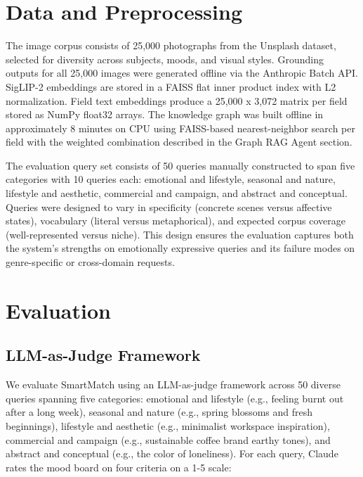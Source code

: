 \documentclass[
  11pt,
]{article}
\begin{document}
\section{Data and Preprocessing}\label{data-and-preprocessing}

The image corpus consists of 25,000 photographs from the Unsplash
dataset, selected for diversity across subjects, moods, and visual
styles. Grounding outputs for all 25,000 images were generated offline
via the Anthropic Batch API. SigLIP-2 embeddings are stored in a FAISS
flat inner product index with L2 normalization. Field text embeddings
produce a 25,000 x 3,072 matrix per field stored as NumPy float32
arrays. The knowledge graph was built offline in approximately 8 minutes
on CPU using FAISS-based nearest-neighbor search per field with the
weighted combination described in the Graph RAG Agent section.

The evaluation query set consists of 50 queries manually constructed to
span five categories with 10 queries each: emotional and lifestyle,
seasonal and nature, lifestyle and aesthetic, commercial and campaign,
and abstract and conceptual. Queries were designed to vary in
specificity (concrete scenes versus affective states), vocabulary
(literal versus metaphorical), and expected corpus coverage
(well-represented versus niche). This design ensures the evaluation
captures both the system's strengths on emotionally expressive queries
and its failure modes on genre-specific or cross-domain requests.

\section{Evaluation}\label{evaluation}

\subsection{LLM-as-Judge Framework}\label{llm-as-judge-framework}

We evaluate SmartMatch using an LLM-as-judge framework across 50 diverse
queries spanning five categories: emotional and lifestyle (e.g., feeling
burnt out after a long week), seasonal and nature (e.g., spring blossoms
and fresh beginnings), lifestyle and aesthetic (e.g., minimalist
workspace inspiration), commercial and campaign (e.g., sustainable
coffee brand earthy tones), and abstract and conceptual (e.g., the color
of loneliness). For each query, Claude rates the mood board on four
criteria on a 1-5 scale:
\end{document}
